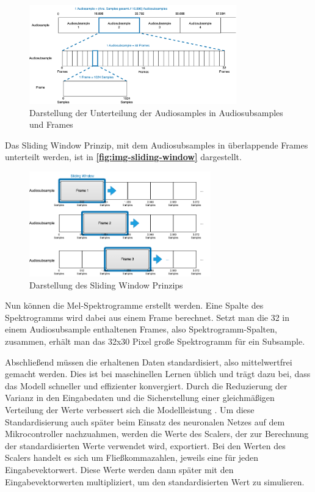 \begin{figure}[h!]
\centering
\includegraphics[width=0.8\textwidth]{images/08_durchfuehrung/nn/audiosubsamples_frames_overview.png}
\caption{Darstellung der Unterteilung der Audiosamples in Audiosubsamples und Frames}
\label{fig:img-audiosubsamples-frames-overview}
\end{figure}

Das Sliding Window Prinzip, mit dem Audiosubsamples in überlappende Frames unterteilt werden, ist in \textbf{\autoref{fig:img-sliding-window}} dargestellt.

\begin{figure}[h!]
\centering
\includegraphics[width=0.7\textwidth]{images/08_durchfuehrung/nn/sliding_window.png}
\caption{Darstellung des Sliding Window Prinzips}
\label{fig:img-sliding-window}
\end{figure}

Nun können die Mel-Spektrogramme erstellt werden. Eine Spalte des Spektrogramms wird dabei aus einem Frame berechnet. Setzt man die 32 in einem Audiosubsample enthaltenen Frames, also Spektrogramm-Spalten, zusammen, erhält man das 32x30 Pixel große Spektrogramm für ein Subsample.

Abschließend müssen die erhaltenen Daten standardisiert, also mittelwertfrei gemacht werden. Dies ist bei maschinellen Lernen üblich und trägt dazu bei, dass das Modell schneller und effizienter konvergiert. Durch die Reduzierung der Varianz in den Eingabedaten und die Sicherstellung einer gleichmäßigen Verteilung der Werte verbessert sich die Modellleistung \cite{ml-standardization-reason}. Um diese Standardisierung auch später beim Einsatz des neuronalen Netzes auf dem Mikrocontroller nachzuahmen, werden die Werte des Scalers, der zur Berechnung der standardisierten Werte verwendet wird, exportiert. Bei den Werten des Scalers handelt es sich um Fließkommazahlen, jeweils eine für jeden Eingabevektorwert. Diese Werte werden dann später mit den Eingabevektorwerten multipliziert, um den standardisierten Wert zu simulieren.


